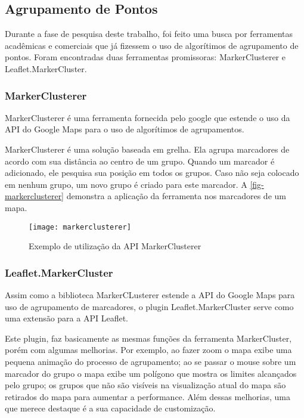 \subsection{Agrupamento de Pontos}
		Durante a fase de pesquisa deste trabalho, foi feito uma busca por ferramentas acadêmicas e comerciais que já fizessem o uso de algorítimos de agrupamento de pontos. Foram encontradas duas ferramentas promissoras: MarkerClusterer e Leaflet.MarkerCluster.
		
		
		\subsubsection{MarkerClusterer}		
		MarkerClusterer \cite[188]{livroGoogleApiV3} é uma ferramenta fornecida pelo google que estende o uso da API do Google Maps para o uso de algorítimos de agrupamentos.
		
		MarkerClusterer é uma solução baseada em grelha. Ela agrupa marcadores de acordo com sua distância ao centro de um grupo. Quando um marcador é adicionado, ele pesquisa sua posição em todos os grupos. Caso não seja colocado em nenhum grupo, um novo grupo é criado para este marcador. A \autoref{fig-markerclusterer} demonstra a aplicação da ferramenta nos marcadores de um mapa.
	\begin{figure}[htb]
	\caption{\label{fig-markerclusterer}Exemplo de utilização da API MarkerClusterer }
	\begin{center}
	    \texttt{[image: markerclusterer]}
	\end{center}
\end{figure}

		\subsubsection{Leaflet.MarkerCluster}
		Assim como a biblioteca MarkerCLusterer estende a API do Google Maps para uso de agrupamento de marcadores, o plugin Leaflet.MarkerCluster\cite{gitleafletmarker} serve como uma extensão para a API Leaflet. 
		
		Este plugin, faz basicamente as mesmas funções da ferramenta MarkerCluster, porém com algumas melhorias. Por exemplo, ao fazer zoom o mapa exibe uma pequena animação do processo de agrupamento; ao se passar o mouse sobre um marcador do grupo o mapa exibe um polígono que mostra os limites alcançados pelo grupo; os grupos que não são visíveis  na visualização atual do mapa são retirados do mapa para aumentar a performance. Além dessas melhorias, uma que merece destaque é a sua capacidade de customização. 

